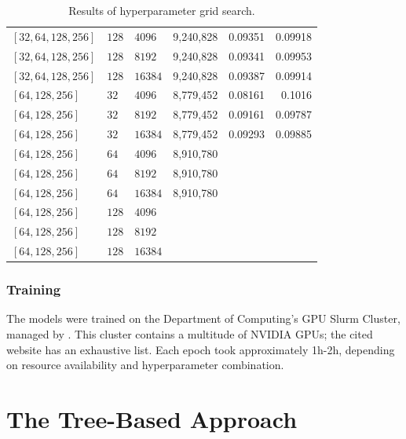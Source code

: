 \begin{table}[H]
\begin{adjustbox}{width=\textwidth}
\begin{tabular}{lll|rrr}
      $[32, 64, 128, 256 ]$& $128$ & $4096$ & 9,240,828 & 0.09351 & 0.09918 \\
      $[32, 64, 128, 256 ]$& $128$ & $8192$ & 9,240,828 & 0.09341 & 0.09953 \\
      $[32, 64, 128, 256 ]$& $128$ & $16384$ & 9,240,828 & 0.09387 & 0.09914 \\[0.5cm]



      $[64, 128, 256 ]$& $32$ & $4096$ & 8,779,452 & 0.08161 & 0.1016 \\
      $[64, 128, 256 ]$& $32$ & $8192$ & 8,779,452 & 0.09161 & 0.09787 \\
      $[64, 128, 256 ]$& $32$ & $16384$ & 8,779,452 & 0.09293 & 0.09885 \\[0.1cm]

      $[64, 128, 256 ]$& $64$ & $4096$ & 8,910,780 && \\
      $[64, 128, 256 ]$& $64$ & $8192$ & 8,910,780 && \\
      $[64, 128, 256 ]$& $64$ & $16384$ & 8,910,780 && \\[0.1cm]

      $[64, 128, 256 ]$& $128$  & $4096$ & && \\
      $[64, 128, 256 ]$& $128$ & $8192$ & && \\
      $[64, 128, 256 ]$& $128$ & $16384$ & && \\

    \end{tabular}
  \end{adjustbox}
  \caption{Results of hyperparameter grid search.}
  \label{tabHyperparam}
\end{table}

\subsection{Training}\label{mlS23}

The models were trained on the Department of Computing's GPU Slurm Cluster,
managed by \citet{csgGPU}. This cluster contains a multitude of NVIDIA GPUs;
the cited website has an exhaustive list. Each epoch took approximately 1h-2h,
depending on resource availability and hyperparameter combination.













\chapter{The Tree-Based Approach}\label{treeChapter}

